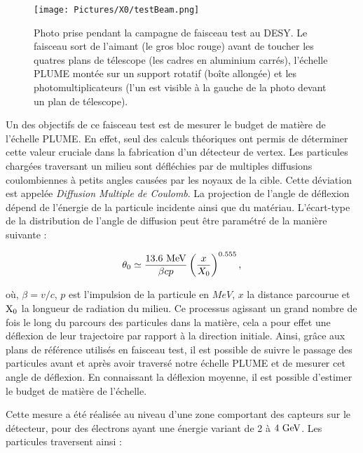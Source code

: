   \begin{figure}
    \centering
    \texttt{[image: Pictures/X0/testBeam.png]}
    \caption{Photo prise pendant la campagne de faisceau test au DESY. Le faisceau sort de l'aimant (le gros bloc rouge) avant de toucher les quatres plans de télescope (les cadres en aluminium carrés), l'échelle PLUME montée sur un support rotatif (boîte allongée) et les photomultiplicateurs (l'un est visible à la gauche de la photo devant un plan de télescope).}
    \label{fig:testBeam_resume}
  \end{figure}

  Un des objectifs de ce faisceau test est de mesurer le budget de matière de l'échelle PLUME.
  En effet, seul des calculs théoriques ont permis de déterminer cette valeur cruciale dans la fabrication d'un détecteur de vertex.
  Les particules chargées traversant un milieu sont défléchies par de multiples diffusions coulombiennes à petits angles causées par les noyaux de la cible.
  Cette déviation est appelée \textit{Diffusion Multiple de Coulomb}.
  La projection de l'angle de déflexion dépend de l'énergie de la particule incidente ainsi que du matériau.
  L'écart-type de la distribution de l'angle de diffusion peut être paramétré de la manière suivante : 

  \begin{equation}
    \theta_0 \simeq \frac{13.6~\rm{MeV}}{\beta c p} \left(\frac{x}{X_0}\right)^{0.555},
    \label{eq:MSC}
  \end{equation} 

  où, $\beta = v/c$, $p$ est l’impulsion de la particule en $MeV$, $x$ la distance parcourue et $\rm{X_0}$ la longueur de radiation du milieu.
  Ce processus agissant un grand nombre de fois le long du parcours des particules dans la matière, cela a pour effet une déflexion de leur trajectoire par rapport à la direction initiale.
  Ainsi, grâce aux plans de référence utilisés en faisceau test, il est possible de suivre le passage des particules avant et après avoir traversé notre échelle PLUME et de mesurer cet angle de déflexion.
  En connaissant la déflexion moyenne, il est possible d'estimer le budget de matière de l'échelle.
  
  Cette mesure a été réalisée au niveau d'une zone comportant des capteurs sur le détecteur, pour des électrons ayant une énergie variant de 2 à $4~\rm{GeV}$.
  Les particules traversent ainsi :

